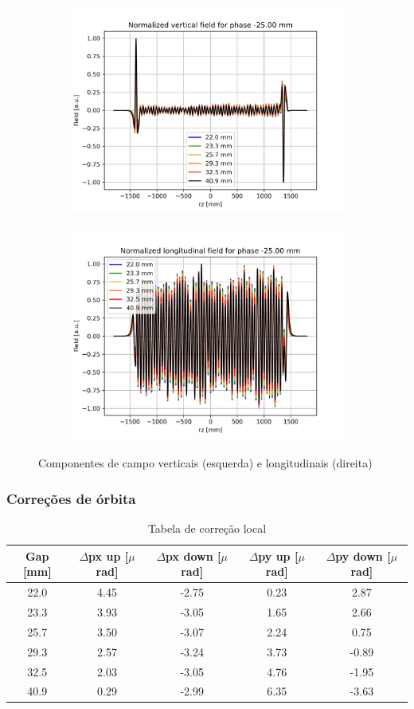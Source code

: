 \documentclass[a4paper,12pt]{article}
\begin{document}
\begin{figure}[H]
\begin{subfigure}{0.5\textwidth}
\includegraphics[width=0.9\linewidth, height=7cm]{figs/phase-25 By.png} 
\label{fig:subim1-25}
\end{subfigure}
\begin{subfigure}{0.5\textwidth}
\includegraphics[width=0.9\linewidth, height=7cm]{figs/phase-25 Bz.png}
\label{fig:subim2-25}
\end{subfigure}
\caption{Componentes de campo verticais (esquerda) e longitudinais (direita)}
\label{fig:by_bz-25}
\end{figure}

\subsubsection{Correções de órbita}

\begin{table}[H]
\centering
\caption{Tabela de correção local}
\begin{tabular}{|c|c|c|c|c|}
\hline
Gap {[}mm{]} & $\Delta$px up {[}$\mu$rad{]} & $\Delta$px down {[}$\mu$rad{]} & $\Delta$py up {[}$\mu$rad{]} & $\Delta$py down {[}$\mu$rad{]} \\ \hline
22.0 & 4.45  & -2.75 & 0.23 & 2.87 \\ \hline
23.3 & 3.93 & -3.05 & 1.65 & 2.66 \\ \hline
25.7 & 3.50  & -3.07 & 2.24 & 0.75 \\ \hline
29.3 & 2.57  & -3.24 & 3.73 & -0.89 \\ \hline
32.5 & 2.03  & -3.05 & 4.76 & -1.95 \\ \hline
40.9 & 0.29  & -2.99 & 6.35 & -3.63 \\ \hline
\end{tabular}
\label{tab:corff-25}
\end{table}
\end{document}
